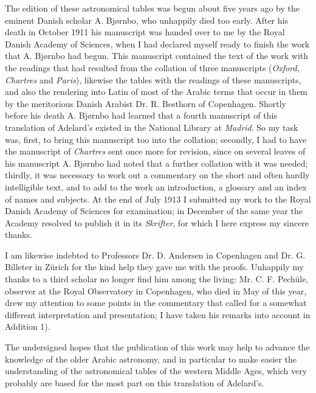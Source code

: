 \documentclass[11pt]{article}
\newcommand{\Pg}[1]{\marginpar{\footnotesize\color{gray}#1}}
\begin{document}
\par The edition of these astronomical tables was begun about five years ago by the eminent Danish scholar A. Bjørnbo, who unhappily died too early. After his death in October 1911 his manuscript was handed over to me by the Royal Danish Academy of Sciences, when I had declared myself ready to finish the work that A. Bjørnbo had begun. This manuscript contained the text of the work with the readings that had resulted from the collation of three manuscripts (\emph{Oxford}, \emph{Chartres} and \emph{Paris}), likewise the tables with the readings of these manuscripts, and also the rendering into Latin of most of the Arabic terms that occur in them by the meritorious Danish Arabist Dr. R. Besthorn of Copenhagen. Shortly before his death A. Bjørnbo had learned that a fourth manuscript of this translation of Adelard's existed in the National Library at \emph{Madrid}. So my task was, first, to bring this manuscript too into the collation; secondly, I had to have the manuscript of \emph{Chartres} sent once more for revision, since on several leaves of his manuscript A. Bjørnbo had noted that a further collation with it was needed; thirdly, it was necessary to work out a commentary on the short and often hardly intelligible text, and to add to the work an introduction, a glossary and an index of names and subjects. At the end of July 1913 I submitted my work to the Royal Danish Academy of Sciences for examination; in December of the same year the Academy resolved to publish it in its \emph{Skrifter}, for which I here express my sincere thanks.\par
\par \Pg{VI}I am likewise indebted to Professors Dr. D. Andersen in Copenhagen and Dr. G. Billeter in Zürich for the kind help they gave me with the proofs. Unhappily my thanks to a third scholar no longer find him among the living: Mr. C. F. Pechüle, observer at the Royal Observatory in Copenhagen, who died in May of this year, drew my attention to some points in the commentary that called for a somewhat different interpretation and presentation; I have taken his remarks into account in Addition 1).\par
\par The undersigned hopes that the publication of this work may help to advance the knowledge of the older Arabic astronomy, and in particular to make easier the understanding of the astronomical tables of the western Middle Ages, which very probably are based for the most part on this translation of Adelard's.\par
\end{document}

